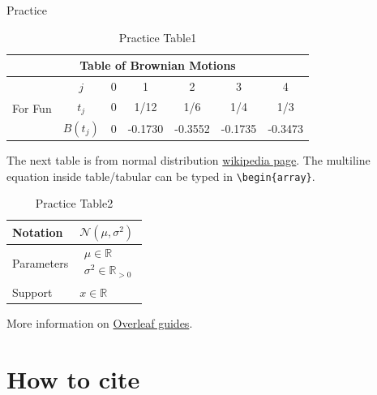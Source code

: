 \documentclass [xcolor=svgnames, t] {beamer}
\begin{document}
\begin{frame}[fragile]{Practice}
    \begin{table}
        \centering
        \begin{tabular}{ |c|c|c|c|c|c|c| }
            \hline
            \multicolumn{7}{|c|}{Table of Brownian Motions}                                   \\
            \hline
            \multirow{3}{2em}{For Fun} & $j$      & 0 & 1       & 2       & 3       & 4       \\
            & $t_j$    & 0 & 1/12    & 1/6     & 1/4     & 1/3     \\
            & $B(t_j)$ & 0 & -0.1730 & -0.3552 & -0.1735 & -0.3473 \\
            \hline
        \end{tabular}
        \caption{Practice Table1
            \label{tab:practable1}}
    \end{table}
    \vspace{-1em}
    The next table is from normal distribution \href{https://en.wikipedia.org/wiki/Normal_distribution}{wikipedia page}. The multiline equation inside table/tabular can be typed in \verb|\begin{array}|.
    \begin{table}
        \centering
        \begin{tabular}{l|l} \hline
            Notation & $\mathcal{N}(\mu,\sigma^2)$\\ \hline
            Parameters & \hspace*{-0.5em}$\begin{array}{l}
                \mu \in \mathbb{R}\\
                \sigma^2 \in \mathbb{R}_{>0}
            \end{array}$\\ \hline
            Support & $x\in\mathbb{R}$ \\\hline
        \end{tabular}
        \caption{Practice Table2\label{tab:practable2}}
    \end{table}
    \vspace{-1em}
    More information on \href{https://www.overleaf.com/learn/latex/tables}{Overleaf guides}.
\end{frame}

\section{How to cite}
\end{document}
